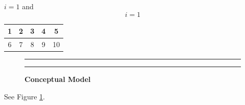 \documentclass[]{article}
\begin{document}
\vspace{0.5in}

\(i=1\) and \[i = 1\]

\vspace{0.5in}

\begin{tabular}{ c c c c c}
  1 & 2 & 3 & 4 & 5 \\
  \hline
  6 & 7 & 8 & 9 & 10
\end{tabular}

\vspace{0.5in}

\begin{figure}[!ht]
    \hrule
    \caption{ \textbf{Conceptual Model} }
    \begin{center}
    \end{center}
    \label{fig:conceptual-model}
    \hrule
\end{figure}

See Figure \ref{fig:conceptual-model}.

\newpage
\end{document}
